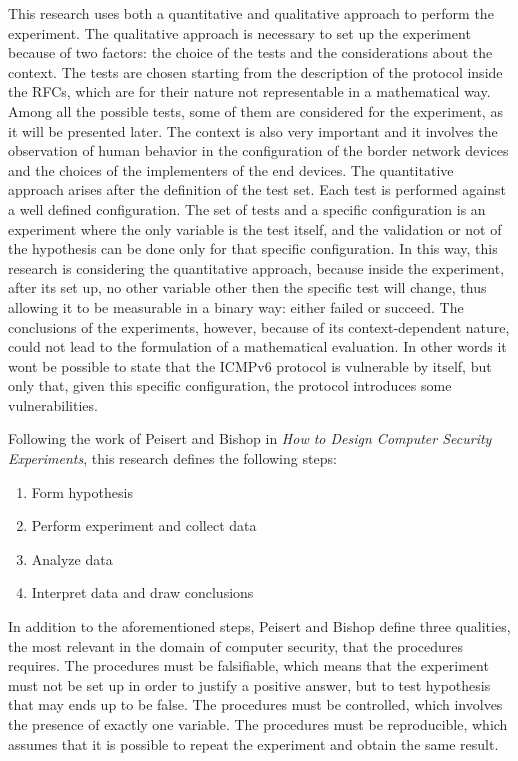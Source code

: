 \documentclass[12pt]{article}
\begin{document}
This research uses both a quantitative and qualitative approach to perform the experiment. The qualitative approach is necessary to set up the experiment because of two factors: the choice of the tests and the considerations about the context. The tests are chosen starting from the description of the protocol inside the RFCs, which are for their nature not representable in a mathematical way. Among all the possible tests, some of them are considered for the experiment, as it will be presented later. The context is also very important and it involves the observation of human behavior in the configuration of the border network devices and the choices of the implementers of the end devices. The quantitative approach arises after the definition of the test set. Each test is performed against a well defined configuration. The set of tests and a specific configuration is an experiment where the only variable is the test itself, and the validation or not of the hypothesis can be done only for that specific configuration. In this way, this research is considering the quantitative approach, because inside the experiment, after its set up, no other variable other then the specific test will change, thus allowing it to be measurable in a binary way: either failed or succeed. The conclusions of the experiments, however, because of its context-dependent nature, could not lead to the formulation of a mathematical evaluation. In other words it wont be possible to state that the ICMPv6 protocol is vulnerable by itself, but only that, given this specific configuration, the protocol introduces some vulnerabilities.

Following the work of Peisert and Bishop in \textit{How to Design Computer Security Experiments}, this research defines the following steps:
\vspace{-10pt}
\begin{enumerate}[noitemsep,topsep=0pt,partopsep=0pt]
 \item Form hypothesis
 \item Perform experiment and collect data
 \item Analyze data
 \item Interpret data and draw conclusions
\end{enumerate}

In addition to the aforementioned steps, Peisert and Bishop define three qualities, the most relevant in the domain of computer security, that the procedures requires. The procedures must be falsifiable, which means that the experiment must not be set up in order to justify a positive answer, but to test hypothesis that may ends up to be false. The procedures must be controlled, which involves the presence of exactly one variable. The procedures must be reproducible, which assumes that it is possible to repeat the experiment and obtain the same result.\cite{secExperiments}
\end{document}
